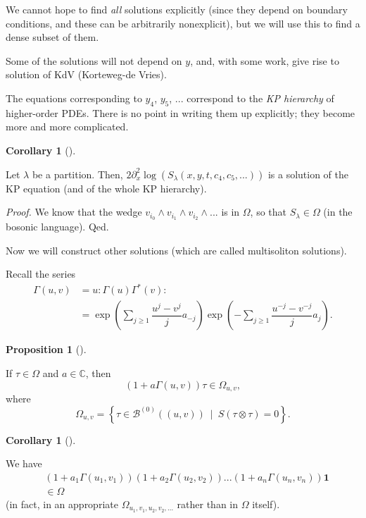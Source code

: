\documentclass
[numbers=enddot,12pt,final,onecolumn,german,notitlepage]{scrartcl}%
\theoremstyle{definition}
\newtheorem{prop}[theo]{Proposition}
\newenvironment{proposition}[1][]
{\begin{prop}[#1]\begin{leftbar}}
{\end{leftbar}\end{prop}}
\newtheorem{coro}[theo]{Corollary}
\newenvironment{corollary}[1][]
{\begin{coro}[#1]\begin{leftbar}}
{\end{leftbar}\end{coro}}
\begin{document}
We cannot hope to find \textit{all} solutions explicitly (since they depend on
boundary conditions, and these can be arbitrarily nonexplicit), but we will
use this to find a dense subset of them.

Some of the solutions will not depend on $y$, and, with some work, give rise
to solution of KdV (Korteweg-de Vries).

The equations corresponding to $y_{4}$, $y_{5}$, $...$ correspond to the
\textit{KP hierarchy} of higher-order PDEs. There is no point in writing them
up explicitly; they become more and more complicated.

\begin{corollary}
Let $\lambda$ be a partition. Then, $2\partial_{x}^{2}\log\left(  S_{\lambda
}\left(  x,y,t,c_{4},c_{5},...\right)  \right)  $ is a solution of the KP
equation (and of the whole KP hierarchy).
\end{corollary}

\textit{Proof.} We know that the wedge $v_{i_{0}}\wedge v_{i_{1}}\wedge
v_{i_{2}}\wedge...$ is in $\Omega$, so that $S_{\lambda}\in\Omega$ (in the
bosonic language). Qed.

Now we will construct other solutions (which are called multisoliton solutions).

Recall the series%
\begin{align*}
\Gamma\left(  u,v\right)   &  =u:\Gamma\left(  u\right)  \Gamma^{\ast}\left(
v\right)  :\\
&  =\exp\left(  \sum\limits_{j\geq1}\dfrac{u^{j}-v^{j}}{j}a_{-j}\right)
\exp\left(  -\sum\limits_{j\geq1}\dfrac{u^{-j}-v^{-j}}{j}a_{j}\right)  .
\end{align*}


\begin{proposition}
\label{prop.KdV.grassm}If $\tau\in\Omega$ and $a\in\mathbb{C}$, then%
\[
\left(  1+a\Gamma\left(  u,v\right)  \right)  \tau\in\Omega_{u,v},
\]
where%
\[
\Omega_{u,v}=\left\{  \tau\in\mathcal{B}^{\left(  0\right)  }\left(  \left(
u,v\right)  \right)  \ \mid\ S\left(  \tau\otimes\tau\right)  =0\right\}  .
\]

\end{proposition}

\begin{corollary}
We have
\begin{align*}
&  \left(  1+a_{1}\Gamma\left(  u_{1},v_{1}\right)  \right)  \left(
1+a_{2}\Gamma\left(  u_{2},v_{2}\right)  \right)  ...\left(  1+a_{n}%
\Gamma\left(  u_{n},v_{n}\right)  \right)  \mathbf{1}\\
&  \in\Omega
\end{align*}
(in fact, in an appropriate $\Omega_{u_{1},v_{1},u_{2},v_{2},...}$ rather than
in $\Omega$ itself).
\end{corollary}
\end{document}
